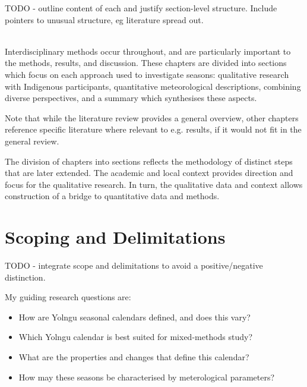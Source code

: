 TODO - outline content of each and justify section-level structure.
Include pointers to unusual structure, eg literature spread out.

~\\

Interdisciplinary methods occur throughout, and are particularly important
to the methods, results, and discussion.  These chapters are divided into
sections which focus on each approach used to investigate seasons:
qualitative research with Indigenous participants,
quantitative meteorological descriptions,
combining diverse perspectives, and
a summary which synthesises these aspects.

Note that while the literature review provides a general overview,
other chapters reference specific literature where relevant to e.g.
results, if it would not fit in the general review.

The division of chapters into sections
reflects the methodology of distinct steps that are
later extended.  The academic and local context provides direction and focus
for the qualitative research.  In turn, the qualitative data and context
allows construction of a bridge to quantitative data and methods.



\section{Scoping and Delimitations}
TODO - integrate scope and delimitations to avoid a positive/negative distinction.

My guiding research questions are:
\begin{itemize}
\item How are Yolngu seasonal calendars defined, and does this vary?
\item Which Yolngu calendar is best suited for mixed-methods study?
\item What are the properties and changes that define this calendar?
\item How may these seasons be characterised by meterological parameters?
\end{itemize}



~\\

